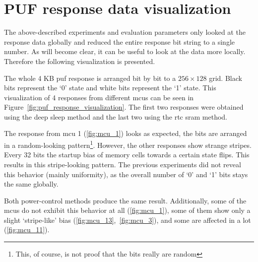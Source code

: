 \section{PUF response data visualization} %

The above-described experiments and evaluation parameters only looked at the response data globally and reduced the entire response bit string to a single number. As will become clear, it can be useful to look at the data more locally. Therefore the following visualization is presented.

The whole 4 KB \gls{puf} response is arranged bit by bit to a $256 \times 128$ grid. Black bits represent the `0' state and white bits represent the `1' state. This visualization of 4 responses from different \glspl{mcu} can be seen in Figure~\ref{fig:puf_response_visualization}. The first two responses were obtained using the deep sleep method and the last two using the \gls{rtc} \gls{sram} method.

The response from \gls{mcu} 1 (\ref{fig:mcu_1}) looks as expected, the bits are arranged in a random-looking pattern\footnote{This, of course, is not proof that the bits really are random}. However, the other responses show strange stripes. Every 32 bits the startup bias of memory cells towards a certain state flips. This results in this stripe-looking pattern. The previous experiments did not reveal this behavior (mainly uniformity), as the overall number of  `0' and `1' bits stays the same globally.

Both power-control methods produce the same result. Additionally, some of the \glspl{mcu} do not exhibit this behavior at all (\ref{fig:mcu_1}), some of them show only a slight `stripe-like' bias (\ref{fig:mcu_13},~\ref{fig:mcu_3}), and some are affected in a lot (\ref{fig:mcu_11}).

